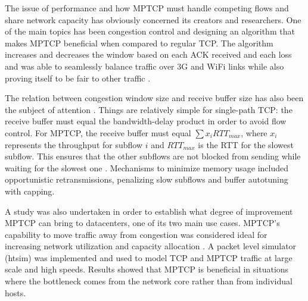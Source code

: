 
The issue of performance and how MPTCP must handle competing flows and share network capacity has obviously concerned its creators and researchers. One of the main topics has been congestion control and designing an algorithm that makes MPTCP beneficial when compared to regular TCP.  The algorithm increases and decreases the window based on each ACK received and each loss and was able to seamlessly balance traffic over 3G and WiFi links while also proving itself to be fair to other traffic \cite{congestion-control}.

The relation between congestion window size and receive buffer size has also been the subject of attention \cite{how-hard-can-it-be}.  Things are relatively simple for single-path TCP: the receive buffer must equal the bandwidth-delay product in order to avoid flow control. For MPTCP, the receive buffer must equal $\sum x_i RTT_{max}$, where $x_i$  represents the throughput for subflow $i$ and $RTT_{max}$ is the RTT for the slowest subflow. This ensures that the other subflows are not blocked from sending while waiting for the slowest one \cite{how-hard-can-it-be}. Mechanisms to minimize memory usage included opportunistic retransmissions, penalizing slow subflows and buffer autotuning with capping.

A study was also undertaken in order to establish what degree of improvement MPTCP can bring to datacenters, one of its two main use cases. MPTCP's capability to move traffic away from congestion was considered ideal for increasing network utilization and capacity allocation \cite{in-datacenters}. A packet level simulator (htsim) was implemented and used to model TCP and MPTCP traffic at large scale and high speeds.  Results showed that MPTCP is beneficial in situations where the bottleneck comes from the network core rather than from individual hosts.